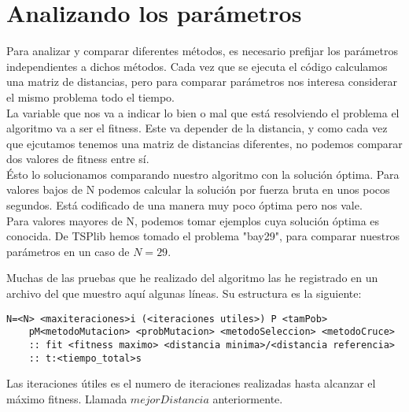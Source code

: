 \documentclass[10pt]{article}
\begin{document}
\section{Analizando los parámetros}
Para analizar y comparar diferentes métodos, es necesario prefijar los parámetros independientes a dichos métodos. Cada vez que se ejecuta el código calculamos una matriz de distancias, pero para comparar parámetros nos interesa considerar el mismo problema todo el tiempo. \\ 
La variable que nos va a indicar lo bien o mal que está resolviendo el problema el algoritmo va a ser el fitness. Este va depender de la distancia, y como cada vez que ejcutamos tenemos una matriz de distancias diferentes, no podemos comparar dos valores de fitness entre sí.\\
Ésto lo solucionamos comparando nuestro algoritmo con la solución óptima. Para valores bajos de N podemos calcular la solución por fuerza bruta en unos pocos segundos. Está codificado de una manera muy poco óptima pero nos vale. \\
Para valores mayores de N, podemos tomar ejemplos cuya solución óptima es conocida. De TSPlib \cite{TSPlib} hemos tomado el problema "bay29", para comparar nuestros parámetros en un caso de $N=29$.
\begin{mdframed}
	Muchas de las pruebas que he realizado del algoritmo las he registrado en un archivo del que muestro aquí algunas líneas. Su estructura es la siguiente:
	\begin{Verbatim}[fontsize=\small]
	N=<N> <maxiteraciones>i (<iteraciones utiles>) P <tamPob>
	pM<metodoMutacion> <probMutacion> <metodoSeleccion> <metodoCruce> 
	:: fit <fitness maximo> <distancia minima>/<distancia referencia>
	:: t:<tiempo_total>s
	\end{Verbatim}
	Las iteraciones útiles es el numero de iteraciones realizadas hasta alcanzar el máximo fitness. Llamada $mejorDistancia$ anteriormente.
\end{mdframed}
\end{document}
